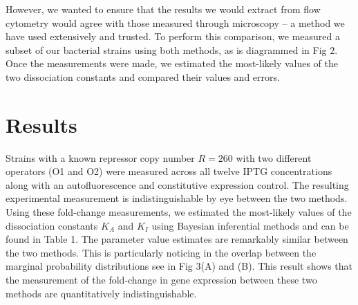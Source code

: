 \documentclass[letterpaper, 10pt]{article}
\begin{document}
However, we wanted to ensure that the results we would extract from flow
cytometry would agree with those measured through microscopy -- a method we
have used extensively and trusted. To perform this comparison, we measured a
subset of our bacterial strains using both methods, as is diagrammed in Fig 2.
Once the measurements were made, we estimated the most-likely values of the
two dissociation constants and compared their values and errors.


\begin{figure}
\label{fig:flowchart}
\end{figure}

\section*{Results}
Strains with a known repressor copy number $R=260$ with two different operators
(O1 and O2) were measured across all twelve IPTG concentrations along with an
autofluorescence and constitutive expression control. The resulting experimental
measurement is indistinguishable by eye between the two methods. Using these
fold-change measurements, we estimated the most-likely values of the dissociation constants
$K_A$ and $K_I$ using Bayesian inferential methods and can be found in Table 1.
The parameter value estimates are remarkably similar between the two methods. This
is particularly noticing in the overlap between the marginal probability distributions
see in Fig 3(A) and (B). This result shows that the measurement of the fold-change
in gene expression between these two methods are quantitatively indistinguishable.
\end{document}
